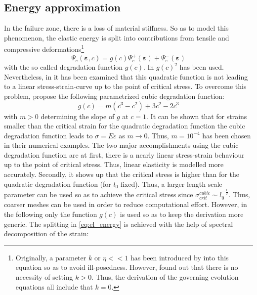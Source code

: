 \subsection{Energy approximation} \label{sec:energy_approx}
In the failure zone, there is a loss of material stiffness. So as to model this phenomenon, the elastic energy is split into contributions from tensile and compressive deformations\footnote{Originally, a parameter $k$ or $\eta<<1$ has been introduced by \citet{09_PF_k} into this equation so as to avoid ill-posedness. However, \citet{01_PF_dyn_brittle} found out that there is no necessity of setting $k>0$. Thus, the derivation of the governing evolution equations all include that $k=0$.}
\begin{equation} \label{eq:el_energy}
	\Psi_{e}\left(\bm{\varepsilon},c\right)=g\left(c\right) \Psi_{e}^{+}\left(\bm{\varepsilon}\right)+\Psi_{e}^{-}\left(\bm{\varepsilon}\right)
\end{equation}
with the so called degradation function $g\left(c\right)$. In \cite{01_PF_dyn_brittle} $g\left(c\right)^2$ has been used. Nevertheless, in \citep{03_PF_ductile} it has been examined that this quadratic function is not leading to a linear stress-strain-curve up to the point of critical stress. To overcome this problem, \citet{03_PF_ductile} propose the following parametrized cubic degradation function:
\begin{equation} \label{eq:cubic_degr_fct}
	g\left(c\right)=m\left(c^{3}-c^{2}\right)+3c^{2}-2c^{3}
\end{equation}
with $m>0$ determining the slope of $g$ at $c=1$. It can be shown that for strains smaller than the critical strain for the quadratic degradation function the cubic degradation function leads to $\sigma=E\varepsilon$ as $m\rightarrow0$. Thus, $m=10^{-4}$ has been chosen in their numerical examples. The two major accomplishments using the cubic degradation function are at first, there is a nearly linear stress-strain behaviour up to the point of critical stress. Thus, linear elasticity is modelled more accurately. Secondly, it shows up that the critical stress is higher than for the quadratic degradation function (for $l_{0}$ fixed). Thus, a larger length scale parameter can be used so as to achieve the critical stress since $\sigma_{crit}^{cubic}\sim l_{0}^{-\frac{1}{2}}$. Thus, coarser meshes can be used in order to reduce computational effort. However, in the following only the function $g\left(c\right)$ is used so as to keep the derivation more generic. The splitting in \eqref{eq:el_energy} is achieved with the help of spectral decomposition of the strain:
